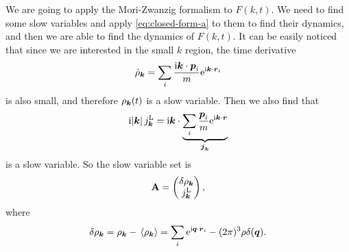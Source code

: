 \documentclass[hyperref, a4paper]{article}
\newcommand*{\ii}{\mathrm{i}}
\newcommand*{\ee}{\mathrm{e}}
\begin{document}
We are going to apply the Mori-Zwanzig formalism to $F(k, t)$. We need to find some slow variables
and apply \eqref{eq:closed-form-a} to them to find their dynamics, and then we are able to find the dynamics 
of $F(k, t)$. It can be easily noticed that since we are interested in the small $k$ region, the time derivative 
\[
    \dot{\rho}_{\vb*{k}} = \sum_i \frac{\ii \vb*{k} \cdot \vb*{p}_i}{m} \ee^{\ii \vb*{k} \cdot \vb*{r}_i }
\]
is also small, and therefore $\rho_{\vb*{k}}(t)$ is a slow variable. Then we also find that 
\[
    \ii \abs*{\vb*{k}} j_{\vb*{k}}^\text{L} = \ii \vb*{k} \cdot 
    \underbrace{\sum_{i} \frac{\vb*{p}_i}{m} \ee^{\ii \vb*{k} \cdot \vb*{r}}}_{\vb*{j}_{\vb*{k}}}
\]
is a slow variable. So the slow variable set is 
\begin{equation}
    \vb{A} = \pmqty{\var{\rho_{\vb*{k}}} \\ j_{\vb*{k}}^\text{L}},  
\end{equation}
where 
\begin{equation}
    \var{\rho_{\vb*{k}}} = \rho_{\vb*{k}} - \expval*{\rho_{\vb*{k}}} 
    = \sum_{i} \ee^{\ii \vb*{q} \cdot \vb*{r}_i} - (2\pi)^3 \rho \delta(\vb*{q}).
\end{equation}
\end{document}
